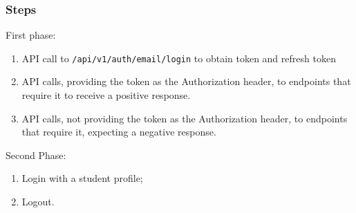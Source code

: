 \subsubsection{Steps}
First phase:
\begin{enumerate}
    \item API call to \verb|/api/v1/auth/email/login| to obtain token and refresh token
    \item API calls, providing the token as the Authorization header, to endpoints that require it to receive a positive response.
    \item API calls, not providing the token as the Authorization header, to endpoints that require it, expecting a negative response.
\end{enumerate}
Second Phase:
\begin{enumerate}
    \item Login with a student profile;
    \item Logout.
\end{enumerate}
